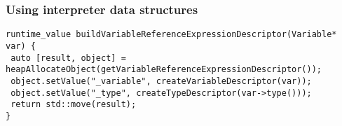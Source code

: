 \begin{frame}[fragile]
    \frametitle{Using interpreter data structures}

    \begin{lstlisting}
runtime_value buildVariableReferenceExpressionDescriptor(Variable* var) {
 auto [result, object] = heapAllocateObject(getVariableReferenceExpressionDescriptor());
 object.setValue("_variable", createVariableDescriptor(var));
 object.setValue("_type", createTypeDescriptor(var->type()));
 return std::move(result);
}
    \end{lstlisting}

\end{frame}

